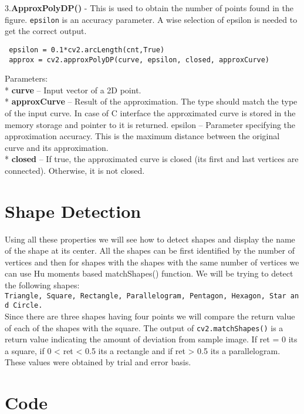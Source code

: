 \documentclass[]{article}
\begin{document}
3.\textbf{ApproxPolyDP()} - This is used to obtain the number of points
found in the figure. \texttt{epsilon} is an accuracy parameter. A wise
selection of epsilon is needed to get the correct output.

\begin{verbatim}
 epsilon = 0.1*cv2.arcLength(cnt,True)
 approx = cv2.approxPolyDP(curve, epsilon, closed, approxCurve) 
\end{verbatim}

Parameters:\\
* \textbf{curve} -- Input vector of a 2D point.\\
* \textbf{approxCurve} -- Result of the approximation. The type should
match the type of the input curve. In case of C interface the
approximated curve is stored in the memory storage and pointer to it is
returned. epsilon -- Parameter specifying the approximation accuracy.
This is the maximum distance between the original curve and its
approximation.\\
* \textbf{closed} -- If true, the approximated curve is closed (its
first and last vertices are connected). Otherwise, it is not closed.

\section{Shape Detection}\label{shape-detection}

Using all these properties we will see how to detect shapes and display
the name of the shape at its center. All the shapes can be first
identified by the number of vertices and then for shapes with the shapes
with the same number of vertices we can use Hu moments based
matchShapes() function. We will be trying to detect the following
shapes:\\
\texttt{Triangle,\ Square,\ Rectangle,\ Parallelogram,\ Pentagon,\ Hexagon,\ Star\ and\ Circle.}\\
Since there are three shapes having four points we will compare the
return value of each of the shapes with the square. The output of
\texttt{cv2.matchShapes()} is a return value indicating the amount of
deviation from sample image. If ret = 0 its a square, if 0 \textless{}
ret \textless{} 0.5 its a rectangle and if ret \textgreater{} 0.5 its a
parallelogram. These values were obtained by trial and error basis.

\section{Code}\label{code}
\end{document}

